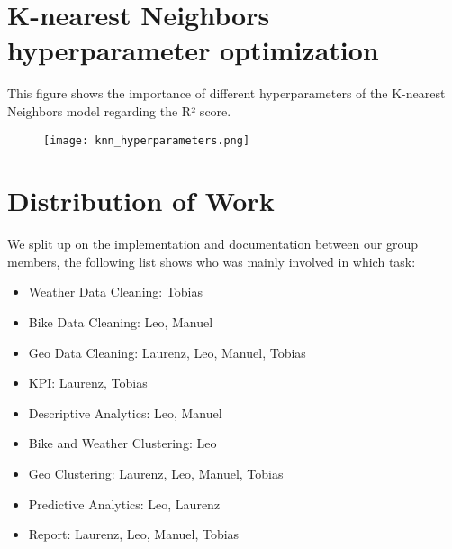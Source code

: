 \begin{appendices}
    
\section{K-nearest Neighbors hyperparameter optimization}\label{appendix:knn_parameters}
This figure shows the importance of different hyperparameters of the K-nearest Neighbors model regarding the R² score.


\begin{figure}[h]
    \texttt{[image: knn\_hyperparameters.png]}
\end{figure}


\section{Distribution of Work}
We split up on the implementation and documentation between our group members, the following list shows who was mainly involved in which task:

\begin{itemize}
    \item Weather Data Cleaning: Tobias
    \item Bike Data Cleaning: Leo, Manuel
    \item Geo Data Cleaning: Laurenz, Leo, Manuel, Tobias
    \item KPI: Laurenz, Tobias
    \item Descriptive Analytics: Leo, Manuel
    \item Bike and Weather Clustering: Leo
    \item Geo Clustering: Laurenz, Leo, Manuel, Tobias
    \item Predictive Analytics: Leo, Laurenz 
    \item Report: Laurenz, Leo, Manuel, Tobias
\end{itemize}

\end{appendices}
